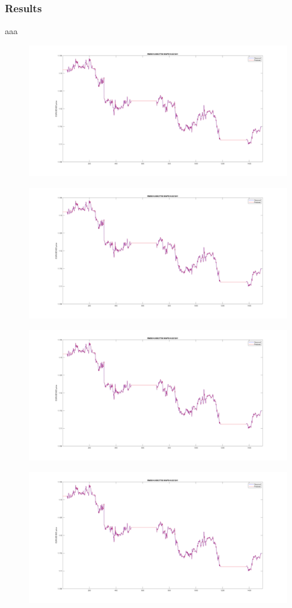 \documentclass[11pt]{article}
\begin{document}
\subsubsection{Results}
aaa
\begin{figure}
  \centering
  \includegraphics[width=0.8\linewidth]{figs/arima_1_1_18_open.png}
  \caption{}
\end{figure}

\begin{figure}
  \centering
  \includegraphics[width=0.8\linewidth]{figs/arima_1_1_18_open.png}
  \caption{}
\end{figure}

\begin{figure}
  \centering
  \includegraphics[width=0.8\linewidth]{figs/arima_1_1_18_open.png}
  \caption{}
\end{figure}

\begin{figure}
  \centering
  \includegraphics[width=0.8\linewidth]{figs/arima_1_1_18_open.png}
  \caption{}
\end{figure}
\end{document}
